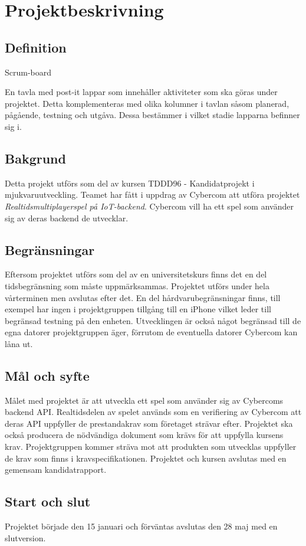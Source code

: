 \section{Projektbeskrivning}

\subsection{Definition}
\begin{labeling}{Scrum-board}
\item [Scrum-board] En tavla med post-it lappar som innehåller aktiviteter som ska göras under 
    projektet. Detta komplementeras med olika kolumner i tavlan såsom planerad, pågående, 
    testning och utgåva. Dessa bestämmer i vilket stadie lapparna befinner sig i. 
\item
\end{labeling}

\subsection{Bakgrund}
Detta projekt utförs som del av kursen TDDD96 - Kandidatprojekt i mjukvaruutveckling. Teamet har fått i uppdrag av Cybercom att utföra projektet \textit{Realtidsmultiplayerspel på IoT-backend}. Cybercom vill ha ett spel som använder sig av deras backend de utvecklar.

\subsection{Begränsningar}
Eftersom projektet utförs som del av en universitetskurs finns det en del tidsbegränsning som måste uppmärksammas. Projektet utförs under hela vårterminen men avslutas efter det. En del hårdvarubegränsningar finns, till exempel har ingen i projektgruppen tillgång till en iPhone vilket leder till begränsad testning på den enheten. Utvecklingen är också något begränsad till de egna datorer projektgruppen äger, förrutom de eventuella datorer Cybercom kan låna ut.

\subsection{Mål och syfte}
Målet med projektet är att utveckla ett spel som använder sig av Cybercoms backend API. Realtidsdelen av spelet används som en verifiering av Cybercom att deras API uppfyller de prestandakrav som företaget strävar efter. Projektet ska också producera de nödvändiga dokument som krävs för att uppfylla kursens krav. Projektgruppen kommer sträva mot att produkten som utvecklas uppfyller de krav som finns i kravspecifikationen. Projektet och kursen avslutas med en gemensam kandidatrapport.



\subsection{Start och slut}
Projektet började den 15 januari och förväntas avslutas den 28 maj med en slutversion.

\pagebreak
